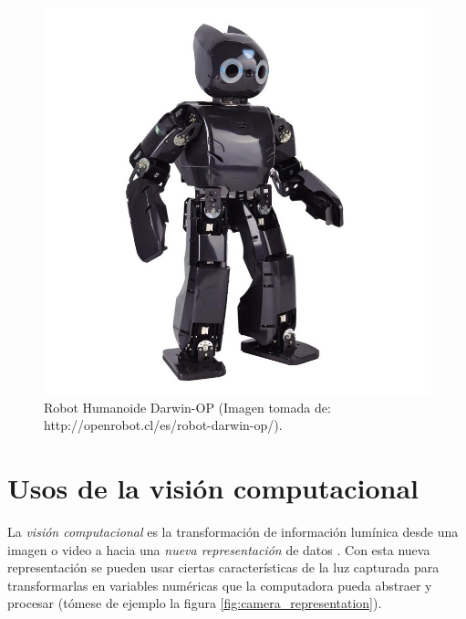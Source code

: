 \begin{figure}
\centering
\includegraphics[scale=0.25]{images/Darwin_OP.jpg}
\caption{Robot Humanoide Darwin-OP (Imagen tomada de: http://openrobot.cl/es/robot-darwin-op/).}
\label{fig:Darwin_OP}
\end{figure}

	\section{Usos de la visión computacional}
	La \textit{visión computacional} es la transformación de información lumínica desde una imagen o video a hacia una \textit{nueva representación} de datos \cite{bradski2008learning}. Con esta nueva representación se pueden usar ciertas características de la luz capturada para transformarlas en variables numéricas que la computadora pueda abstraer y procesar (tómese de ejemplo la figura \ref{fig:camera_representation}).

